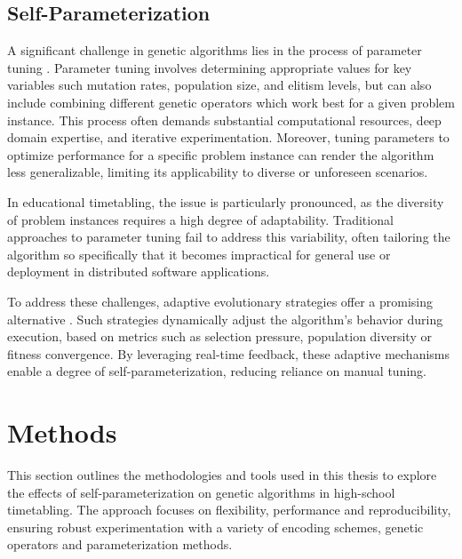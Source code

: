 \documentclass[english,examples]{isasthesis}
\begin{document}
\subsection{Self-Parameterization}
A significant challenge in genetic algorithms lies in the process of parameter
tuning \cite{Katoch2021}.
Parameter tuning involves determining appropriate values for key variables such
mutation rates, population size, and elitism levels, but can also include
combining different genetic operators which work best for a given problem
instance.
This process often demands substantial computational resources, deep domain
expertise, and iterative experimentation.
Moreover, tuning parameters to optimize performance for a specific problem
instance can render the algorithm less generalizable, limiting its applicability
to diverse or unforeseen scenarios.

In educational timetabling, the issue is particularly pronounced, as the
diversity of problem instances requires a high degree of adaptability.
Traditional approaches to parameter tuning fail to address this variability,
often tailoring the algorithm so specifically that it becomes impractical for
general use or deployment in distributed software applications.

To address these challenges, adaptive evolutionary strategies offer a promising
alternative \cite{quaer2024survey}. Such strategies dynamically adjust the
algorithm's behavior during execution, based on metrics such as selection
pressure, population diversity or fitness convergence.
By leveraging real-time feedback, these adaptive mechanisms enable a degree of
self-parameterization, reducing reliance on manual tuning.



\section{Methods}
This section outlines the methodologies and tools used in this thesis to explore
the effects of self-parameterization on genetic algorithms in high-school
timetabling. The approach focuses on flexibility, performance and
reproducibility, ensuring robust experimentation with a variety of encoding
schemes, genetic operators and parameterization methods.
\end{document}
